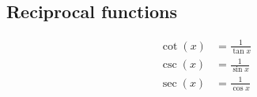\subsection*{Reciprocal functions}

\begin{align*}
  \cot(x) &= \frac{1}{\tan x}\\
  \csc(x) &= \frac{1}{\sin x}\\
  \sec(x) &= \frac{1}{\cos x}
\end{align*}